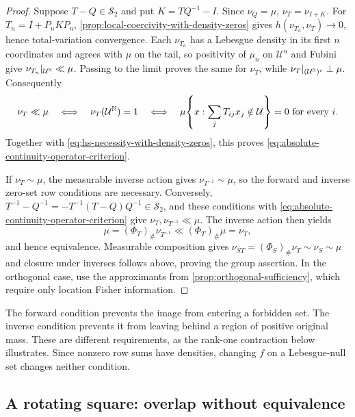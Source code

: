 \begin{proof}
Suppose $T-Q\in\mathcal S_2$ and put $K=TQ^{-1}-I$.  Since $\nu_Q=\mu$,
$\nu_T=\nu_{I+K}$.  For $T_n=I+P_nKP_n$,
\cref{prop:local-coercivity-with-density-zeros} gives
$h(\nu_{T_n},\nu_T)\to0$, hence total-variation convergence.  Each $\nu_{T_n}$ has a
Lebesgue density in its first $n$ coordinates and agrees with $\mu$ on the
tail, so positivity of $\mu_n$ on $\mathcal U^n$ and Fubini give
$\nu_{T_n}|_{\mathcal U^{\mathbb N}}\ll\mu$.  Passing to the limit proves the same
for $\nu_T$, while
$\nu_T|_{(\mathcal U^{\mathbb N})^c}\perp\mu$.  Consequently
\[
 \nu_T\ll\mu
 \quad\Longleftrightarrow\quad
 \nu_T(\mathcal U^{\mathbb N})=1
 \quad\Longleftrightarrow\quad
 \mu\!\left\{x:\sum_jT_{ij}x_j\notin\mathcal U\right\}=0
       \text{ for every }i.
\]
Together with \eqref{eq:hs-necessity-with-density-zeros}, this proves
\eqref{eq:absolute-continuity-operator-criterion}.

If $\nu_T\sim\mu$, the measurable inverse action gives
$\nu_{T^{-1}}\sim\mu$, so the forward and inverse zero-set row conditions are
necessary.  Conversely,
$T^{-1}-Q^{-1}=-T^{-1}(T-Q)Q^{-1}\in\mathcal S_2$, and these conditions with
\eqref{eq:absolute-continuity-operator-criterion} give
$\nu_T,\nu_{T^{-1}}\ll\mu$.  The inverse action then yields
\[
 \mu=(\Phi_T)_\#\nu_{T^{-1}}\ll(\Phi_T)_\#\mu=\nu_T,
\]
and hence equivalence.  Measurable composition gives
$\nu_{ST}=(\Phi_S)_\#\nu_T\sim\nu_S\sim\mu$ and closure under inverses follows
above, proving the group assertion.  In the orthogonal case, use the
approximants from \cref{prop:orthogonal-sufficiency}, which require only
location Fisher information.
\end{proof}

The forward condition prevents the image from entering a forbidden set.
The inverse condition prevents it from leaving behind a region of positive
original mass. These are different requirements, as the rank-one
contraction below illustrates. Since nonzero row sums have densities,
changing \(f\) on a Lebesgue-null set changes neither condition.

\subsection{A rotating square: overlap without equivalence}


